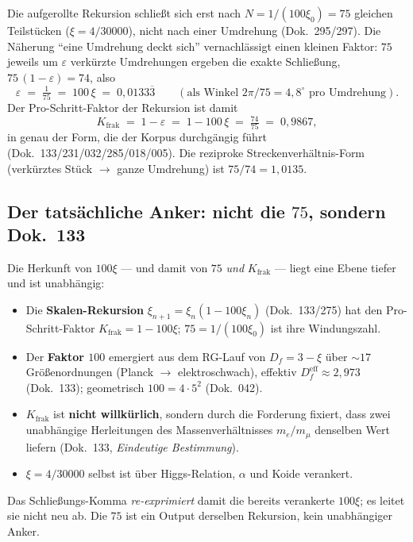 Die aufgerollte Rekursion schließt sich erst nach $N=1/(100\xi_0)=75$ gleichen
Teilstücken ($\xi=4/30000$), nicht nach einer Umdrehung (Dok.~295/297). Die
Näherung \enquote{eine Umdrehung deckt sich} vernachlässigt einen kleinen
Faktor: $75$ jeweils um $\varepsilon$ verkürzte Umdrehungen ergeben die exakte
Schließung, $75\,(1-\varepsilon)=74$, also
\begin{equation}
  \varepsilon \;=\; \tfrac{1}{75} \;=\; 100\,\xi \;=\; 0{,}0133\overline{3}
  \qquad(\text{als Winkel } 2\pi/75 = 4{,}8^\circ \text{ pro Umdrehung}).
\end{equation}
Der Pro-Schritt-Faktor der Rekursion ist damit
\begin{equation}
  K_{\text{frak}} \;=\; 1 - \varepsilon \;=\; 1 - 100\,\xi \;=\; \tfrac{74}{75}
  \;=\; 0{,}9867,
\end{equation}
in genau der Form, die der Korpus durchgängig führt (Dok.~133/231/032/285/018/005).
Die reziproke Streckenverhältnis-Form (verkürztes Stück $\to$ ganze Umdrehung)
ist $75/74 = 1{,}0135$.


\subsection*{Der tatsächliche Anker: nicht die $75$, sondern Dok.~133}

Die Herkunft von $100\xi$ --- und damit von $75$ \emph{und}
$K_{\text{frak}}$ --- liegt eine Ebene tiefer und ist unabhängig:
\begin{itemize}
  \item Die \textbf{Skalen-Rekursion} $\xi_{n+1}=\xi_n(1-100\xi_n)$
    (Dok.~133/275) hat den Pro-Schritt-Faktor $K_{\text{frak}}=1-100\xi$;
    $75=1/(100\xi_0)$ ist ihre Windungszahl.
  \item Der \textbf{Faktor $100$} emergiert aus dem RG-Lauf von
    $D_f=3-\xi$ über $\sim 17$ Größenordnungen (Planck $\to$ elektroschwach),
    effektiv $D_f^{\text{eff}}\approx 2{,}973$ (Dok.~133); geometrisch
    $100=4\cdot 5^2$ (Dok.~042).
  \item $K_{\text{frak}}$ ist \textbf{nicht willkürlich}, sondern durch die
    Forderung fixiert, dass zwei unabhängige Herleitungen des Massenverhältnisses
    $m_e/m_\mu$ denselben Wert liefern (Dok.~133, \emph{Eindeutige Bestimmung}).
  \item $\xi=4/30000$ selbst ist über Higgs-Relation, $\alpha$ und Koide
    verankert.
\end{itemize}
Das Schließungs-Komma \emph{re-exprimiert} damit die bereits verankerte
$100\xi$; es leitet sie nicht neu ab. Die $75$ ist ein Output derselben
Rekursion, kein unabhängiger Anker.

